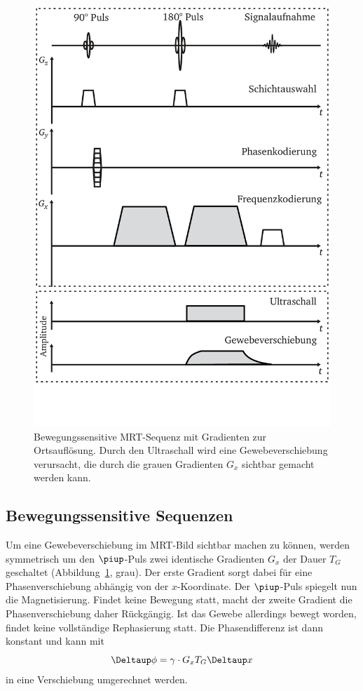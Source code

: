 \documentclass[
    11pt,
    ngerman
]{scrreprt}
\begin{document}
\begin{figure}
    \centering
    \includegraphics[width=.7\textwidth]{Abbildungen/sediffmono.pdf}
    \caption{%
        Bewegungssensitive MRT-Sequenz mit Gradienten zur Ortsauflösung. Durch den Ultraschall wird eine Gewebeverschiebung verursacht, die durch die grauen Gradienten $G_x$ sichtbar gemacht werden kann.
    }
    \label{fig:bew-sens-sequenz}
\end{figure}

\subsection{Bewegungssensitive Sequenzen}

Um eine Gewebeverschiebung im MRT-Bild sichtbar machen zu können, werden symmetrisch um den $\piup$-Puls zwei identische Gradienten $G_x$ der Dauer $T_G$ geschaltet (Abbildung~\ref{fig:bew-sens-sequenz}, grau). Der erste Gradient sorgt dabei für eine Phasenverschiebung abhängig von der $x$-Koordinate. Der $\piup$-Puls spiegelt nun die Magnetisierung. Findet keine Bewegung statt, macht der zweite Gradient die Phasenverschiebung daher Rückgängig. Ist das Gewebe allerdings bewegt worden, findet keine vollständige Rephasierung statt. Die Phasendifferenz ist dann konstant und kann mit
\[
    \Deltaup \phi = \gamma \cdot G_x T_G \Deltaup x
\]
in eine Verschiebung umgerechnet werden.
\end{document}
